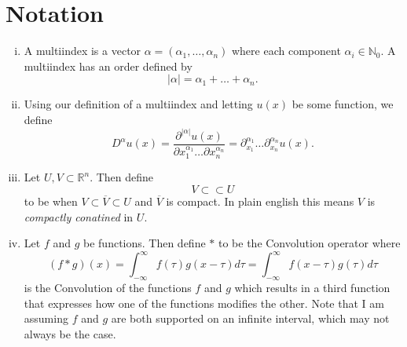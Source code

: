 \documentclass[11pt]{article}
\theoremstyle{definition}
\begin{document}
\section{Notation}
\begin{enumerate}[(i)]
\item A multiindex is a vector $\alpha = (\alpha_1, \dots, \alpha_n)$ where each component $\alpha_i \in \mathbb{N}_0$.
A multiindex has an order defined by
\[|\alpha| = \alpha_1 + \dots + \alpha_n.\]

\item Using our definition of a multiindex and letting $u(x)$ be some function, we define
\[D^{\alpha}u(x) = \frac{\partial^{|\alpha|}u(x)}{\partial x_1^{\alpha_1} \dots \partial x_n^{\alpha_n}} = \partial_{x_1}^{\alpha_1}\dots\partial_{x_n}^{\alpha_n}u(x).\]

\item Let $U,V \subset \mathbb{R}^n$. Then define
\[V \subset\subset U\]
to be when $V \subset \overline{V} \subset U$ and $\overline{V}$ is compact. In plain english this means $V$ is \textit{compactly conatined} in $U$.

\item Let $f$ and $g$ be functions. Then define $*$ to be the Convolution operator where
\[(f*g)(x) = \int_{-\infty}^{\infty}{f(\tau)g(x - \tau)d\tau} = \int_{-\infty}^{\infty}{f(x - \tau)g(\tau)d\tau}\]
is the Convolution of the functions $f$ and $g$ which results in a third function that expresses
how one of the functions modifies the other. Note that I am assuming $f$ and $g$ are both supported on an
infinite interval, which may not always be the case.
\end{enumerate}
\end{document}
